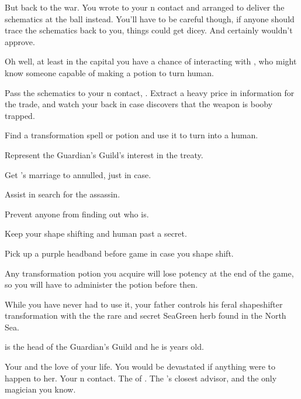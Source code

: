 \documentclass[char]{NeptuneBall}
\begin{document}
But back to the war. You wrote to your \pPacifica{}n contact and arranged to deliver the schematics at the ball instead. You'll have to be careful though, if anyone should trace the schematics back to you, things could get dicey. And \cQueen{} certainly wouldn't approve.

Oh well, at least in the capital you have a chance of interacting with \cManta{}, who might know someone capable of making a potion to turn \cQueen{} human.

\begin{itemz}[Goals]
  \item Pass the schematics to your \pPacifica{}n contact, \cSpy{}. Extract a heavy price in information for the trade, and watch your back in case \cSpy{\they} discovers that the weapon is booby trapped.
  \item Find a transformation spell or potion and use it to turn \cQueen{} into a human.
  \item Represent the Guardian's Guild's interest in the treaty.
  \item Get \cQueen{}'s marriage to \cKing{} annulled, just in case.
  \item Assist \cQueen{} in \cQueen{\their} search for the assassin.
  \item Prevent anyone from finding out who \cQueen{} is.
  \item Keep your shape shifting and human past a secret.
\end{itemz}

\begin{itemz}[Notes]
  \item Pick up a purple headband before game in case you shape shift.
  \item Any transformation potion you acquire will lose potency at the end of the game, so you will have to administer the potion before then.
\end{itemz}

\begin{itemz}[Trivia]
	\item While you have never had to use it, your father controls his feral shapeshifter transformation with the the rare and secret SeaGreen herb found in the North Sea.
  \item \cKratos{} is the head of the Guardian's Guild and he is \cKratos{\MYnumber} years old.
\end{itemz}

\begin{contacts}
  \contact{\cQueen{}} Your \cQueen{\spouse} and the love of your life. You would be devastated if anything were to happen to her.
  \contact{\cSpy{}} Your \pPacifica{}n contact.
  \contact{\cKing{}} The \cKing{\King} of \pAtlantis{}.
  \contact{\cManta{}} The \cKing{\King}'s closest advisor, and the only magician you know.
\end{contacts}
\end{document}
